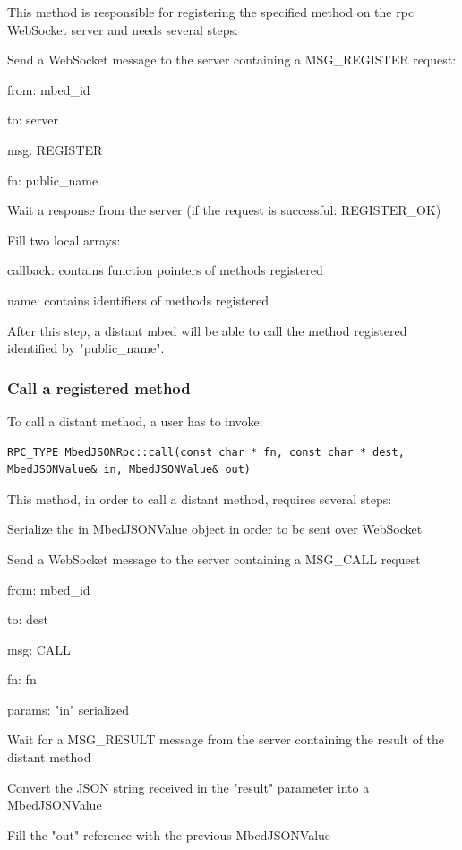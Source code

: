 \documentclass[pdftex,10pt,a4paper]{report}
\newenvironment{packed_item}{
\begin{itemize}
  \setlength{\itemsep}{1pt}
  \setlength{\parskip}{0pt}
  \setlength{\parsep}{0pt}
}{\end{itemize}}
\begin{document}
This method is responsible for registering the specified method on the rpc WebSocket server and needs several steps:
\begin{packed_item}
	\item Send a WebSocket message to the server containing a MSG\_REGISTER request:
	\begin{packed_item}
		\item from: mbed\_id
		\item to: server
		\item msg: REGISTER
		\item fn: public\_name 
	\end{packed_item}
	\item Wait a response from the server (if the request is successful: REGISTER\_OK)
	\item Fill two local arrays:
	\begin{packed_item}
		\item callback: contains function pointers of methods registered
		\item name: contains identifiers of methods registered
	\end{packed_item}
\end{packed_item}


After this step, a distant mbed will be able to call the method registered identified by "public\_name".
    
\subsubsection{Call a registered method}
To call a distant method, a user has to invoke:
\begin{lstlisting}[label=Call a distant method,caption=Call a distant method]
RPC_TYPE MbedJSONRpc::call(const char * fn, const char * dest, MbedJSONValue& in, MbedJSONValue& out)
\end{lstlisting}

This method, in order to call a distant method, requires several steps:
\begin{packed_item}
	\item Serialize the in MbedJSONValue object in order to be sent over WebSocket
	\item Send a WebSocket message to the server containing a MSG\_CALL request
	\begin{packed_item}
		\item from: mbed\_id
		\item to: dest
		\item msg: CALL
		\item fn: fn
		\item params: "in" serialized
	\end{packed_item}
	\item Wait for a MSG\_RESULT message from the server containing the result of the distant method
	\item Convert the JSON string received in the "result" parameter into a MbedJSONValue
	\item Fill the "out" reference with the previous MbedJSONValue
\end{packed_item}
\end{document}
